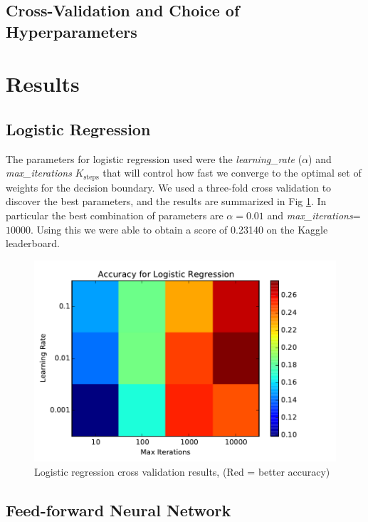 \documentclass[conference]{IEEEtran}
\begin{document}
\subsection{Cross-Validation and Choice of Hyperparameters}

\section{Results}

\subsection{Logistic Regression}
The parameters for logistic regression used were the \emph{learning\_rate} ($\alpha$) and \emph{max\_iterations} $K_{\text{steps}}$ that will control how fast we converge to the optimal set of weights for the decision boundary. We used a three-fold cross validation to discover the best parameters, and the results are summarized in Fig \ref{LR_accuracy}. In particular the best combination of parameters are $\alpha=0.01$ and \emph{max\_iterations}=$10000$. Using this we were able to obtain a score of 0.23140 on the Kaggle leaderboard.

\begin{figure}[h]
	\centering
	\includegraphics[scale=0.50]{LR_accuracy.pdf}
	\caption{Logistic regression cross validation results, (Red = better accuracy)}
	\label{LR_accuracy}
\end{figure}

\subsection{Feed-forward Neural Network}
\end{document}
